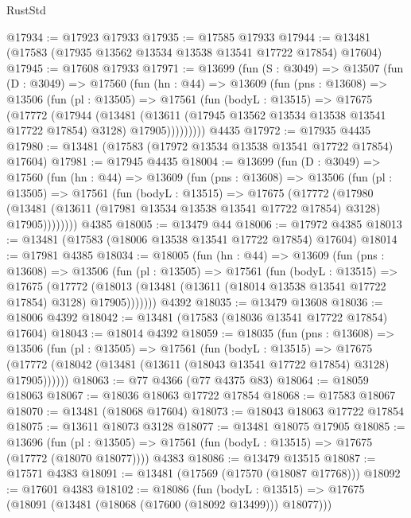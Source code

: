 \begin{lexlean}{RustStd}
\begin{coremodule}
@17934 := @17923 @17933
@17935 := @17585 @17933
@17944 := @13481 (@17583 (@17935 @13562 @13534 @13538 @13541 @17722 @17854) @17604)
@17945 := @17608 @17933
@17971 := @13699
    (fun (S : @3049) =>
    @13507
      (fun (D : @3049) =>
      @17560
        (fun (hn : @44) =>
        @13609
          (fun (pns : @13608) =>
          @13506
            (fun (pl : @13505) =>
            @17561
              (fun (bodyL : @13515) =>
              @17675
                (@17772
                  (@17944
                    (@13481
                      (@13611 (@17945 @13562 @13534 @13538 @13541 @17722 @17854) @3128)
                      @17905)))))))))
    @4435
@17972 := @17935 @4435
@17980 := @13481 (@17583 (@17972 @13534 @13538 @13541 @17722 @17854) @17604)
@17981 := @17945 @4435
@18004 := @13699
    (fun (D : @3049) =>
    @17560
      (fun (hn : @44) =>
      @13609
        (fun (pns : @13608) =>
        @13506
          (fun (pl : @13505) =>
          @17561
            (fun (bodyL : @13515) =>
            @17675
              (@17772
                (@17980
                  (@13481 (@13611 (@17981 @13534 @13538 @13541 @17722 @17854) @3128) @17905))))))))
    @4385
@18005 := @13479 @44
@18006 := @17972 @4385
@18013 := @13481 (@17583 (@18006 @13538 @13541 @17722 @17854) @17604)
@18014 := @17981 @4385
@18034 := @18005
    (fun (hn : @44) =>
    @13609
      (fun (pns : @13608) =>
      @13506
        (fun (pl : @13505) =>
        @17561
          (fun (bodyL : @13515) =>
          @17675
            (@17772
              (@18013 (@13481 (@13611 (@18014 @13538 @13541 @17722 @17854) @3128) @17905)))))))
    @4392
@18035 := @13479 @13608
@18036 := @18006 @4392
@18042 := @13481 (@17583 (@18036 @13541 @17722 @17854) @17604)
@18043 := @18014 @4392
@18059 := @18035
    (fun (pns : @13608) =>
    @13506
      (fun (pl : @13505) =>
      @17561
        (fun (bodyL : @13515) =>
        @17675 (@17772 (@18042 (@13481 (@13611 (@18043 @13541 @17722 @17854) @3128) @17905))))))
@18063 := @77 @4366 (@77 @4375 @83)
@18064 := @18059 @18063
@18067 := @18036 @18063 @17722 @17854
@18068 := @17583 @18067
@18070 := @13481 (@18068 @17604)
@18073 := @18043 @18063 @17722 @17854
@18075 := @13611 @18073 @3128
@18077 := @13481 @18075 @17905
@18085 := @13696
    (fun (pl : @13505) => @17561 (fun (bodyL : @13515) => @17675 (@17772 (@18070 @18077))))
    @4383
@18086 := @13479 @13515
@18087 := @17571 @4383
@18091 := @13481 (@17569 (@17570 (@18087 @17768)))
@18092 := @17601 @4383
@18102 := @18086
    (fun (bodyL : @13515) => @17675 (@18091 (@13481 (@18068 (@17600 (@18092 @13499))) @18077)))

\end{coremodule}
\end{lexlean}
